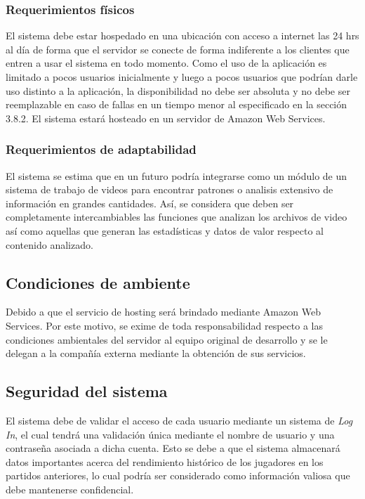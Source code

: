 \documentclass[a4paper]{article}
\newcommand\tab[1][0.55cm]{\hspace*{#1}}
\begin{document}
{\subsubsection{Requerimientos físicos} 

	\tab El sistema debe estar hospedado en una ubicación con acceso a internet las 24 hrs al día de forma que el servidor se conecte de forma indiferente a los clientes que entren a usar el sistema en todo momento. Como el uso de la aplicación es limitado a pocos usuarios inicialmente y luego a pocos usuarios que podrían darle uso distinto a la aplicación, la disponibilidad no debe ser absoluta y no debe ser reemplazable en caso de fallas en un tiempo menor al especificado en la sección 3.8.2.  El sistema estará hosteado en un servidor de Amazon Web Services.

\subsubsection{Requerimientos de adaptabilidad}

	\tab El sistema se estima que en un futuro podría integrarse como un módulo de un sistema de trabajo de videos para encontrar patrones o analisis extensivo de información en grandes cantidades. Así, se considera que deben ser completamente intercambiables las funciones que analizan los archivos de video así como aquellas que generan las estadísticas y datos de valor respecto al contenido analizado. 

\color{Blue}
\subsection{Condiciones de ambiente}
\color{black}
\justify 

	\tab Debido a que el servicio de hosting será brindado mediante  Amazon Web Services. Por este motivo, se exime de toda responsabilidad respecto a las condiciones ambientales del servidor al equipo original de desarrollo y se le delegan a la compañía externa mediante la obtención de sus servicios. 

\color{Blue}
\subsection{Seguridad del sistema}
\color{black}
\justify 

	\tab El sistema debe de validar el acceso de cada usuario mediante un sistema de \textit{Log In}, el cual tendrá una validación única mediante el nombre de usuario y una contraseña asociada a dicha cuenta. Esto se debe a que el sistema almacenará datos importantes acerca del rendimiento histórico de los jugadores en los partidos anteriores, lo cual podría ser considerado como información valiosa que debe mantenerse confidencial. \\

}
\end{document}
